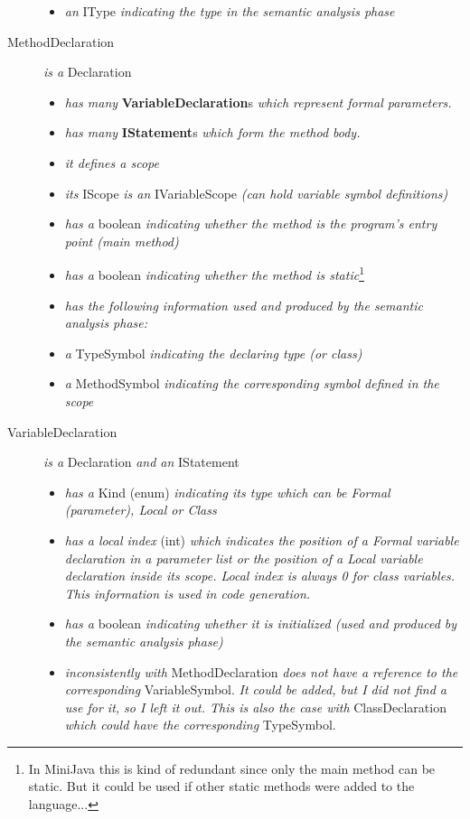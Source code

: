\documentclass[a4paper,11pt]{article}
\begin{document}
\begin{description}
\begin{itemize}
        \item \emph{an} IType \emph{indicating the type in the semantic analysis phase}
      \end{itemize}
    \item[MethodDeclaration] \emph{is a} Declaration
      \begin{itemize}
        \item \emph{has many} \textbf{VariableDeclaration}s \emph{which represent formal parameters.}
        \item \emph{has many} \textbf{IStatement}s \emph{which form the method body.}
        \item \emph{it defines a scope}
        \item \emph{its} IScope \emph{is an} IVariableScope \emph{(can hold variable symbol definitions)}
        \item \emph{has a} boolean \emph{indicating whether the method is the program's entry point (main method)}
        \item \emph{has a} boolean \emph{indicating whether the method is static}\footnote{In MiniJava this is kind of redundant since only the main method can be static. But it could be used if other static methods were added to the language...}
        \item \emph{has the following information used and produced by the semantic analysis phase:}
        \item \emph{a} TypeSymbol \emph{indicating the declaring type (or class)}
        \item \emph{a} MethodSymbol \emph{indicating the corresponding symbol defined in the scope}
      \end{itemize}
    \item[VariableDeclaration] \emph{is a} Declaration \emph{and an} IStatement
      \begin{itemize}
        \item \emph{has a} Kind (enum) \emph{indicating its type which can be Formal (parameter), Local or Class}
        \item \emph{has a local index} (int) \emph{which indicates the position of a Formal variable declaration in a parameter list or the position of a Local variable declaration inside its scope. Local index is always 0 for class variables. This information is used in code generation.}
        \item \emph{has a} boolean \emph{indicating whether it is initialized (used and produced by the semantic analysis phase)}
        \item \emph{inconsistently with} MethodDeclaration \emph{does not have a reference to the corresponding} VariableSymbol. \emph{It could be added, but I did not find a use for it, so I left it out. This is also the case with} ClassDeclaration \emph{which could have the corresponding} TypeSymbol.

\end{itemize}
\end{description}
\end{document}
